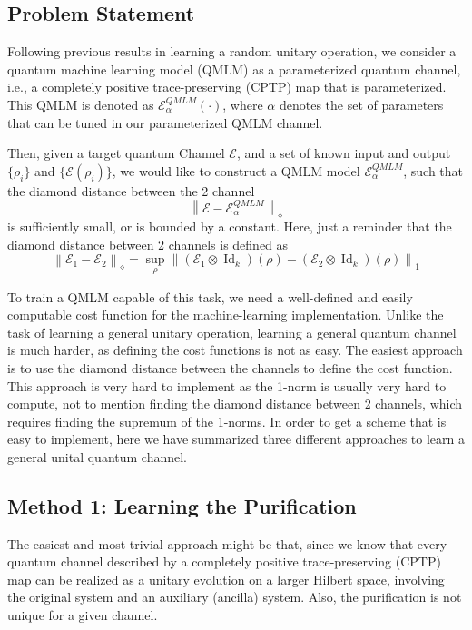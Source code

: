 \documentclass[%
 reprint,
 amsmath,amssymb,
 aps,
]{revtex4-2}
\newcommand{\E}{\mathcal{E}}
\newcommand{\norm}[1]{\left\lVert#1\right\rVert}
\begin{document}
\subsection{Problem Statement}
Following previous results in learning a random unitary operation, we consider a quantum machine learning model (QMLM) as a parameterized quantum channel, i.e., a completely positive trace-preserving (CPTP) map that is parameterized. This QMLM is denoted as $\mathcal{E}^{QMLM}_{\alpha}(\cdot)$, where $\alpha$ denotes the set of parameters that can be tuned in our parameterized QMLM channel.

Then, given a target quantum Channel $\mathcal{E}$, and a set of known input and output $\{\rho_i\}$ and $\{\mathcal{E}(\rho_i)\}$, we would like to construct a QMLM model $\E^{QMLM}_{\alpha}$, such that the diamond distance between the 2 channel
\begin{equation}
    \norm{\E-\E^{QMLM}_{\alpha}}_\diamond
\end{equation}
is sufficiently small, or is bounded by a constant. Here, just a reminder that the diamond distance between 2 channels is defined as
\begin{equation}
    \norm{\E_1 - \E_2}_{\diamond} = \sup_{\rho} \left\| (\E_1 \otimes \operatorname{Id}_k)(\rho) - (\E_2 \otimes \operatorname{Id}_k)(\rho) \right\|_1
\end{equation}

To train a QMLM capable of this task, we need a well-defined and easily computable cost function for the machine-learning implementation. Unlike the task of learning a general unitary operation, learning a general quantum channel is much harder, as defining the cost functions is not as easy. The easiest approach is to use the diamond distance between the channels to define the cost function. This approach is very hard to implement as the 1-norm is usually very hard to compute, not to mention finding the diamond distance between 2 channels, which requires finding the supremum of the 1-norms. In order to get a scheme that is easy to implement, here we have summarized three different approaches to learn a general unital quantum channel.

\subsection{Method 1: Learning the Purification}

The easiest and most trivial approach might be that, since we know that every quantum channel described by a completely positive trace-preserving (CPTP) map can be realized as a unitary evolution on a larger Hilbert space, involving the original system and an auxiliary (ancilla) system. Also, the purification is not unique for a given channel.
\end{document}
